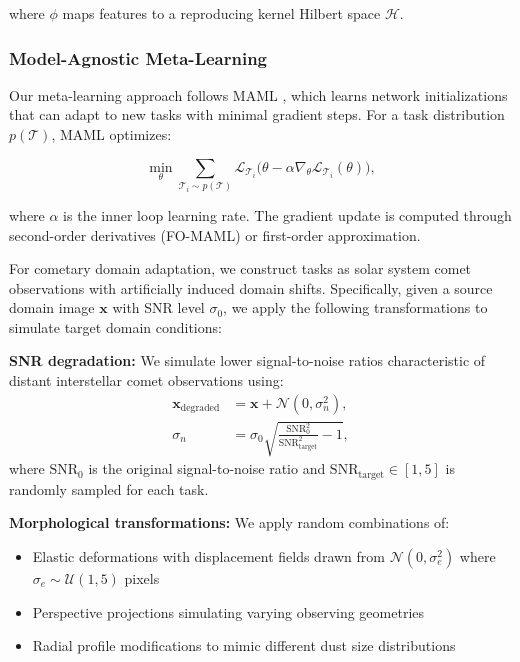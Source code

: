 \documentclass[preprint2]{aastex631}
\begin{document}
where $\phi$ maps features to a reproducing kernel Hilbert space $\mathcal{H}$.

\subsubsection{Model-Agnostic Meta-Learning}

Our meta-learning approach follows MAML \citep{finn17}, which learns network initializations that can adapt to new tasks with minimal gradient steps. For a task distribution $p(\mathcal{T})$, MAML optimizes:

\begin{equation}\label{eq:maml}
\min_\theta \sum_{\mathcal{T}_i \sim p(\mathcal{T})}
\mathcal{L}_{\mathcal{T}_i}\bigl(\theta - \alpha \nabla_\theta \mathcal{L}_{\mathcal{T}_i}(\theta)\bigr),
\end{equation}

where $\alpha$ is the inner loop learning rate. The gradient update is computed through second-order derivatives (FO-MAML) or first-order approximation.

For cometary domain adaptation, we construct tasks as solar system comet observations with artificially induced domain shifts. Specifically, given a source domain image $\mathbf{x}$ with SNR level $\sigma_0$, we apply the following transformations to simulate target domain conditions:

\textbf{SNR degradation:} We simulate lower signal-to-noise ratios characteristic of distant interstellar comet observations using:
\begin{equation}\label{eq:snr_degradation}
\begin{split}
\mathbf{x}_{\text{degraded}} &= \mathbf{x} + \mathcal{N}(0, \sigma_n^2), \\
\sigma_n &= \sigma_0 \sqrt{\frac{\text{SNR}_0^2}{\text{SNR}_{\text{target}}^2} - 1},
\end{split}
\end{equation}
where $\text{SNR}_0$ is the original signal-to-noise ratio and $\text{SNR}_{\text{target}} \in [1, 5]$ is randomly sampled for each task.

\textbf{Morphological transformations:} We apply random combinations of:
\begin{itemize}
    \item Elastic deformations with displacement fields drawn from $\mathcal{N}(0, \sigma_e^2)$ where $\sigma_e \sim \mathcal{U}(1, 5)$ pixels
    \item Perspective projections simulating varying observing geometries
    \item Radial profile modifications to mimic different dust size distributions
\end{itemize}
\end{document}
